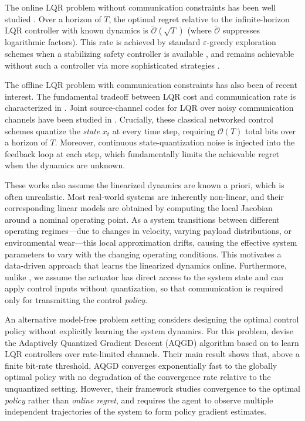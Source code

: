 \documentclass[11pt,journal,onecolumn]{IEEEtran}
\begin{document}
The online LQR problem without communication constraints has been well studied \cite{mania2019, simchowitz20a, kargin}. Over a horizon of $T$, the optimal regret relative to the infinite-horizon LQR controller with known dynamics is $\tilde{\mathcal{O}}(\sqrt{T})$ (where $\tilde{\mathcal{O}}$ suppresses logarithmic factors). This rate is achieved by standard $\varepsilon$-greedy exploration schemes when a stabilizing safety controller is available \cite{mania2019}, and remains achievable without such a controller via more sophisticated strategies \cite{kargin}.

The offline LQR problem with communication constraints has also been of recent interest. The fundamental tradeoff between LQR cost and communication rate is characterized in \cite{kostina2019}. Joint source-channel codes for LQR over noisy communication channels have been studied in \cite{tatikondacontrol, barronisit, sahaimitter}. Crucially, these classical networked control schemes quantize the \emph{state} $x_t$ at every time step, requiring $\mathcal{O}(T)$ total bits over a horizon of $T$. Moreover, continuous state-quantization noise is injected into the feedback loop at each step, which fundamentally limits the achievable regret when the dynamics are unknown.

These works also assume the linearized dynamics are known a priori, which is often unrealistic. Most real-world systems are inherently non-linear, and their corresponding linear models are obtained by computing the local Jacobian around a nominal operating point. As a system transitions between different operating regimes---due to changes in velocity, varying payload distributions, or environmental wear---this local approximation drifts, causing the effective system parameters to vary with the changing operating conditions. This motivates a data-driven approach that learns the linearized dynamics online. Furthermore, unlike \cite{kostina2019, tatikondacontrol, barronisit, sahaimitter}, we assume the actuator has direct access to the system state and can apply control inputs without quantization, so that communication is required only for transmitting the control \emph{policy}.

An alternative model-free problem setting considers designing the optimal control policy without explicitly learning the system dynamics. For this problem, \cite{mitra2024} devise the Adaptively Quantized Gradient Descent (AQGD) algorithm based on \cite{fazel18a} to learn LQR controllers over rate-limited channels. Their main result shows that, above a finite bit-rate threshold, AQGD converges exponentially fast to the globally optimal policy with no degradation of the convergence rate relative to the unquantized setting. However, their framework studies convergence to the optimal \emph{policy} rather than \emph{online regret}, and requires the agent to observe multiple independent trajectories of the system to form policy gradient estimates.
\end{document}
